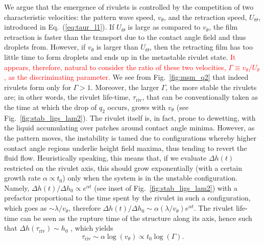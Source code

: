 \documentclass[twocolumn,amsmath,amssymb,showpacs,prl,superscriptaddress]{revtex4-1} %
\begin{document}
We argue that the emergence of rivulets is controlled by the competition of two characteristic velocities: the pattern wave speed, $v_{\theta}$, and the retraction speed, $U_{\Theta}$, introduced in Eq.~(\ref{eq:taur_l1}). 
If $U_{\Theta}$ is large as compared to $v_{\theta}$, the film retraction is faster than the transport due to the contact angle field and thus droplets from. However, if $v_{\theta}$ is larger than $U_{\Theta}$, then the retracting film has too little time to form droplets and ends up in the metastable rivulet state. \textcolor{red}{It appears, therefore, natural to consider the ratio of these two velocities, 
$\Gamma \equiv v_{\theta}/U_{\theta}$, as the discriminating parameter.}
We see from Fig.~\ref{fig:msm_q2} that indeed rivulets form only for $\Gamma > 1$. 
Moreover, the larger $\Gamma$, the more stable the rivulets are; in other words, the rivulet life-time, $\tau_{\text{riv}}$, that can be conventionally taken as the time at which the drop of $q_2$ occurs, grows with $v_{\theta}$ (see Fig.~\ref{fig:stab_ligs_lam2}).
The rivulet itself is, in fact, prone to dewetting, with the liquid accumulating over patches around contact angle minima. However, as the pattern moves, the instability is tamed due to configurations whereby higher contact angle regions underlie height field maxima, thus tending to revert the fluid flow.
Heuristically speaking, this means that, if we evaluate $\Delta h(t)$ restricted on the rivulet axis, this should grow exponentially (with a certain growth rate $\alpha \propto t_0$) only when the system is in the unstable configuration. Namely, $\Delta h(t)/\Delta h_0 \propto e^{\alpha t}$ (see inset of Fig.~\ref{fig:stab_ligs_lam2}) with a prefactor proportional to the time spent by the rivulet in such a configuration, which goes as $\sim \lambda/v_{\theta}$, therefore 
$\Delta h(t)/\Delta h_0 \sim \alpha (\lambda/v_{\theta})e^{\alpha t}$. 
The rivulet life-time can be seen as the rupture time of the structure along its axis, hence such that $\Delta h (\tau_{\text{riv}}) \sim h_0$ \cite{PhysRevE.104.034801}, which yields
\begin{equation}\label{eq:rivlt}
    \tau_{\text{riv}} \sim \alpha \log(v_{\theta}) \propto t_0 \log(\Gamma). 
\end{equation}
\end{document}
